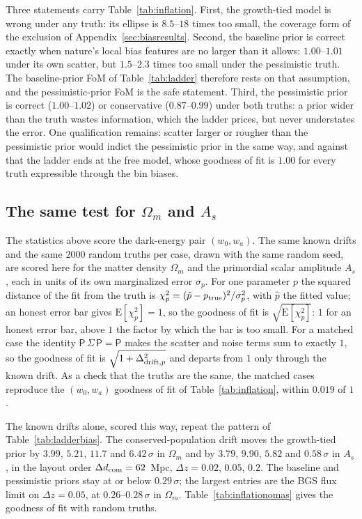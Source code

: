 \documentclass[11pt]{article}
\newcommand{\Prec}{\mathsf{P}}
\begin{document}
Three statements carry Table~\ref{tab:inflation}.  First, the
growth-tied model is wrong under any truth: its ellipse is $8.5$--$18$ times too
small, the coverage form of the exclusion of
Appendix~\ref{sec:biasresults}.  Second, the baseline prior is correct
exactly when nature's local bias features are no larger than it
allows: $1.00$--$1.01$ under its own scatter, but $1.5$--$2.3$
times too small under the pessimistic truth.  The baseline-prior FoM
of Table~\ref{tab:ladder} therefore rests on that assumption, and the
pessimistic-prior FoM is the safe statement.  Third, the pessimistic prior
is correct ($1.00$--$1.02$) or conservative ($0.87$--$0.99$) under
both truths: a prior wider than the truth wastes information, which
the ladder prices, but never understates the error.  One
qualification remains: scatter larger or rougher than the
pessimistic prior would indict the pessimistic prior in the same way,
and against that the ladder ends at the free model, whose
goodness of fit is $1.00$ for every truth expressible through the bin
biases.

\subsection{The same test for $\Omega_m$ and $A_s$}
\label{sec:inflationomas}

The statistics above score the dark-energy pair $(w_0, w_a)$.  The
same known drifts and the same $2000$ random truths per case, drawn
with the same random seed, are scored here for the matter density
$\Omega_m$ and the primordial scalar amplitude $A_s$, each in units of
its own marginalized error $\sigma_p$.  For one parameter $p$ the
squared distance of the fit from the truth is
$\chi^2_p = (\hat{p} - p_{\rm true})^2/\sigma_p^2$, with $\hat{p}$ the
fitted value; an honest error bar gives $\mathrm{E}[\chi^2_p] = 1$, so
the goodness of fit is $\sqrt{\mathrm{E}[\chi^2_p]}$: $1$ for an honest
error bar, above $1$ the factor by which the bar is too small.  For a
matched case the identity $\Prec\,\Sigma\,\Prec = \Prec$ makes the
scatter and noise terms sum to exactly $1$, so the goodness of fit is
$\sqrt{1 + \Delta_{{\rm drift},p}^2}$ and departs from $1$ only through
the known drift.  As a check that the truths are the same, the matched
cases reproduce the $(w_0, w_a)$ goodness of fit of
Table~\ref{tab:inflation}, within $0.019$ of $1$.

The known drifts alone, scored this way, repeat the pattern of
Table~\ref{tab:ladderbias}.  The conserved-population drift moves the
growth-tied prior by $3.99$, $5.21$, $11.7$ and $6.42\,\sigma$ in $\Omega_m$
and by $3.79$, $9.90$, $5.82$ and $0.58\,\sigma$ in $A_s$, in the
layout order $\Delta d_{\rm com} = 62$~Mpc, $\Delta z = 0.02$,
$0.05$, $0.2$.  The baseline and pessimistic priors stay at or below
$0.29\,\sigma$; the largest entries are the BGS flux limit on
$\Delta z = 0.05$, at $0.26$--$0.28\,\sigma$ in $\Omega_m$.
Table~\ref{tab:inflationomas} gives the goodness of fit with random
truths.
\end{document}
